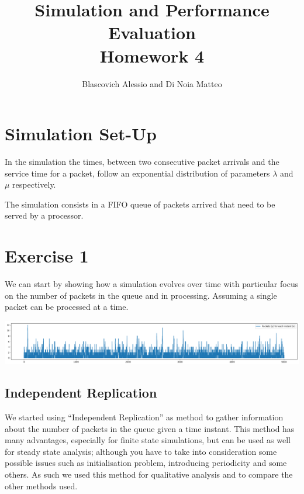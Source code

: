 \documentclass[10pt,a4paper]{article}
\title{
  {\Huge Simulation and Performance Evaluation}\\
  \huge Homework 4\\
}
\author{Blascovich Alessio and Di Noia Matteo}
\begin{document}
\maketitle

\section*{Simulation Set-Up}

In the simulation the times, between two consecutive packet arrivals and the service time for a packet, follow an exponential distribution of parameters \(\lambda\) and \(\mu\) respectively.

The simulation consists in a FIFO queue of packets arrived that need to be served by a processor.

\section*{Exercise 1}

We can start by showing how a simulation evolves over time with particular focus on the number of packets in the queue and in processing. Assuming a single packet can be processed at a time.

\begin{center}
  \includegraphics[width=\textwidth]{whole-simulation.png}
\end{center}


\subsection*{Independent Replication}

We started using ``Independent Replication'' as method to gather information about the number of packets in the queue given a time instant. This method has many advantages, especially for finite state simulations, but can be used as well for steady state analysis; although you have to take into consideration some possible issues such as initialisation problem, introducing periodicity and some others. As such we used this method for qualitative analysis and to compare the other methods used.
\end{document}

